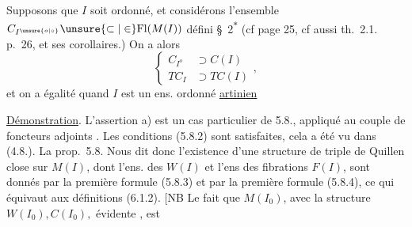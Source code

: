 
 Supposons que $I$ soit   
ordonné, et considérons l'ensemble
$C_{I^{\unsure{o|\circ}}}\unsure{\subset|\in}\mathrm{Fl}(M(I))$ défini   \S~2\textsuperscript{$*$}
(cf page 25, cf aussi th.~2.1. p.~26,  et
ses corollaires.) On a alors
\[
\left\{\begin{aligned}
 C_{I^{o}}&\supset C(I)\\
 TC_{I}&\supset TC(I)
\end{aligned}\right.,\tag*{(6.1.15)}
\]
et on a égalité quand $I$ est  un
ens. ordonné \uline{artinien}

\uline{Démonstration}. L'assertion a) est un
cas particulier de 5.8., appliqué au
couple de foncteurs adjoints
.
Les conditions (5.8.2) sont satisfaites,
cela a été vu dans (4.8.). La prop.~5.8.
Nous dit donc l'existence d'une
structure de triple de Quillen close
sur $M(I)$, dont l'ens. des  
$W(I)$ et l'ens des fibrations $F(I)$, sont
donnés par la première formule (5.8.3)
et par la première formule (5.8.4),
ce qui équivaut aux définitions (6.1.2).
[NB Le fait que $M(I_{0})$, avec la
structure $W(I_{0}),C(I_{0}),$ évidente , est

